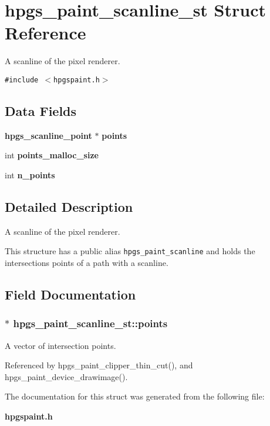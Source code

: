 \section{hpgs\_\-paint\_\-scanline\_\-st Struct Reference}
\label{structhpgs__paint__scanline__st}
A scanline of the pixel renderer.  


{\tt \#include $<$hpgspaint.h$>$}

\subsection*{Data Fields}
\begin{Indent}{\bf }\par
\begin{CompactItemize}
\item 
{\bf hpgs\_\-scanline\_\-point} $\ast$ {\bf points}
\item 
int \textbf{points\_\-malloc\_\-size}\label{structhpgs__paint__scanline__st_19a51f9f8896740a26bb07ef277500c0}

\item 
int \textbf{n\_\-points}\label{structhpgs__paint__scanline__st_2e5ba769139b867a4bd641c34a91b75e}

\end{CompactItemize}
\end{Indent}


\subsection{Detailed Description}
A scanline of the pixel renderer. 

This structure has a public alias {\tt hpgs\_\-paint\_\-scanline} and holds the intersections points of a path with a scanline. 

\subsection{Field Documentation}
\subsubsection[points]{$\ast$ {\bf hpgs\_\-paint\_\-scanline\_\-st::points}}\label{structhpgs__paint__scanline__st_596e27a603eeeb05fafa0215ed518898}


A vector of intersection points. 

Referenced by hpgs\_\-paint\_\-clipper\_\-thin\_\-cut(), and hpgs\_\-paint\_\-device\_\-drawimage().

The documentation for this struct was generated from the following file:\begin{CompactItemize}
\item 
{\bf hpgspaint.h}\end{CompactItemize}
